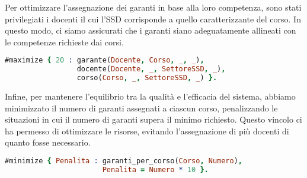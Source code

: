 Per ottimizzare l'assegnazione dei garanti in base alla loro competenza, sono stati 
privilegiati i docenti il cui l'SSD corrisponde a quello caratterizzante del corso.
In questo modo, ci siamo assicurati che i garanti siano adeguatamente allineati con 
le competenze richieste dai corsi.

\begin{lstlisting}[language=prolog, caption=Preferenza dei garanti con macrosettore coerente a quello del corso.]
% Ottimizzare i garanti con SSD caratterizzante
#maximize { 20 : garante(Docente, Corso, _, _), 
                 docente(Docente, _, SettoreSSD, _), 
                 corso(Corso, _, SettoreSSD, _) }.
\end{lstlisting}

Infine, per mantenere l'equilibrio tra la qualità e l'efficacia del sistema, abbiamo 
minimizzato il numero di garanti assegnati a ciascun corso, penalizzando le situazioni 
in cui il numero di garanti supera il minimo richiesto. Questo vincolo ci ha permesso 
di ottimizzare le risorse, evitando l'assegnazione di più docenti di quanto fosse necessario.

\begin{lstlisting}[language=prolog, caption=Minimizzazione dei garanti per corso di laurea.]
% Minimizzo il numero di garanti per ogni corso
#minimize { Penalita : garanti_per_corso(Corso, Numero),
                       Penalita = Numero * 10 }.
\end{lstlisting}

